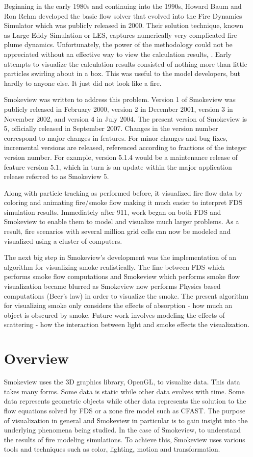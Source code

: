 \documentclass[11pt,twoside]{book}
\begin{document}
Beginning in the early 1980s and continuing into the 1990s, Howard Baum and Ron Rehm developed the basic flow solver that evolved into the Fire Dynamics Simulator which was publicly released in 2000.  Their solution technique, known as Large Eddy Simulation or LES, captures numerically very complicated fire plume dynamics.  Unfortunately, the power of the methodology could not be appreciated without an effective way to view the calculation results, .  Early attempts to visualize the calculation results consisted of nothing more than little particles swirling about in a box.  This was useful to the model developers, but hardly to anyone else.  It just did not look like a fire.

Smokeview was written to address this problem.
Version 1 of Smokeview was publicly released in February 2000, version 2 in December 2001, version 3 in November 2002, and version 4 in July 2004.
The present version of Smokeview is 5, officially released in September 2007. Changes in
the version number correspond to major changes in features. For minor changes and bug fixes, incremental
versions are released, referenced according to fractions of the integer
version number. For example, version 5.1.4 would be a maintenance release of feature
version 5.1, which in turn is an update within the major application release referred to as Smokeview 5.

Along with particle tracking as performed before, it visualized fire flow data by coloring and animating fire/smoke flow making it much easier to interpret FDS simulation results.  Immediately after 911, work began on both FDS and Smokeview to enable them to model and visualize much larger problems.  As a result, fire scenarios with several million grid cells can now be modeled and visualized using a cluster of computers.

The next big step in Smokeview's development was the implementation of an algorithm for visualizing smoke realistically.   The line between FDS which performs smoke flow computations and Smokeview which performs smoke flow visualization became blurred as Smokeview now performs Physics based computations (Beer's law) in order to visualize the smoke.  The present algorithm for visualizing smoke only considers the effects of absorption - how much an object is obscured by smoke.  Future work involves modeling the effects of scattering - how the interaction between light and smoke effects the visualization.


\section{Overview}
Smokeview uses the 3D graphics library, OpenGL, to visualize data.
This data takes many forms.  Some data is static while other data evolves with time.
Some data represents geometric objects while other data represents the solution to the flow equations solved by FDS or a zone fire model such as CFAST.
The purpose of visualization in general and Smokeview in particular is to gain insight into the underlying phenomena being studied.  In the case of Smokeview, to
understand the results of fire modeling simulations.  To achieve this, Smokeview
uses various tools and techniques such as color, lighting, motion and transformation.
\end{document}
